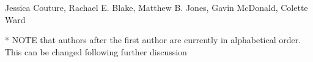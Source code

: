 Jessica Couture,
Rachael E. Blake,
Matthew B. Jones,
Gavin McDonald, 
Colette Ward

* NOTE that authors after the first author are currently in alphabetical order.  This can be changed following further discussion

